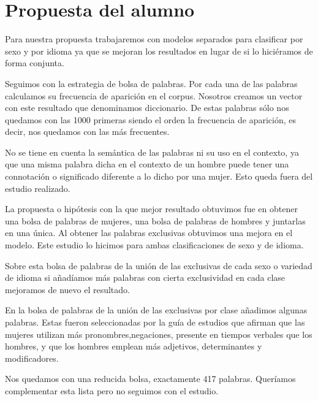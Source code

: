 \documentclass[11pt,a4paper]{article}
\begin{document}
\section{Propuesta del alumno}
\justify
Para nuestra propuesta trabajaremos con modelos separados para clasificar por sexo y por idioma ya que se mejoran los resultados en lugar de si lo hici\'eramos de forma conjunta.\par\noindent
Seguimos con la estrategia de bolsa de palabras. Por cada una de las palabras calculamos su frecuencia de aparici\'on en el corpus. Nosotros creamos un vector con este resultado que denominamos diccionario. De estas palabras s\'olo nos quedamos con las 1000 primeras siendo el orden la frecuencia de aparici\'on, es decir, nos quedamos con las m\'as frecuentes.\par\noindent
No se tiene en cuenta la sem\'antica de las palabras ni su uso en el contexto, ya que una misma palabra dicha en el contexto de un hombre puede tener una connotaci\'on o significado diferente a lo dicho por una mujer. Esto queda fuera del estudio realizado. \par\noindent
La propuesta o hip\'otesis con la que mejor resultado obtuvimos fue en obtener una bolsa de palabras de mujeres, una bolsa de palabras de hombres y juntarlas en una \'unica. Al obtener las palabras exclusivas obtuvimos una mejora en el modelo. Este estudio lo hicimos para ambas clasificaciones de sexo y de idioma. \par\noindent
Sobre esta bolsa de palabras de la uni\'on de las exclusivas de cada sexo o variedad de idioma si añad\'iamos m\'as palabras con cierta exclusividad en cada clase mejoramos de nuevo el resultado. \par\noindent 
En la bolsa de palabras de la uni\'on de las exclusivas por clase añadimos algunas palabras. Estas fueron seleccionadas por la gu\'ia de estudios que afirman que las mujeres utilizan m\'as pronombres,negaciones, presente en tiempos verbales que los hombres, y que los hombres emplean m\'as adjetivos, determinantes y modificadores.  \par\noindent
Nos quedamos con una reducida bolsa, exactamente 417 palabras. Quer\'iamos complementar esta lista pero no seguimos con el estudio. \par\noindent
\end{document}

